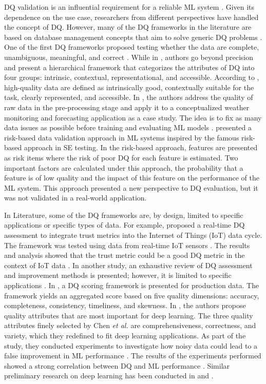 DQ validation is an influential requirement for a reliable ML system \cite{Foidl2019}. Given its dependence on the use case, researchers from different perspectives have handled the concept of DQ. However, many of the DQ frameworks in the literature are based on database management concepts that aim to solve generic DQ problems \cite{taleb2021}. One of the first DQ frameworks proposed testing whether the data are complete, unambiguous, meaningful, and correct \cite{Wand1996}. While in \cite{WangStrong1996}, authors go beyond precision and present a hierarchical framework that categorizes the attributes of DQ into four groups: intrinsic, contextual, representational, and accessible. According to \cite{WangStrong1996}, high-quality data are defined as intrinsically good, contextually suitable for the task, clearly represented, and accessible. In \cite{Juneja2019}, the authors address the quality of raw data in the pre-processing stage and apply it to a conceptualized weather monitoring and forecasting application as a case study. The idea is to fix as many data issues as possible before training and evaluating ML models \cite{Juneja2019}. \cite{Foidl2019} presented a risk-based data validation approach in ML systems inspired by the famous risk-based approach in SE testing. In the risk-based approach, features are presented as risk items where the risk of poor DQ for each feature is estimated. Two important factors are calculated under this approach, the probability that a feature is of low quality and the impact of this feature on the performance of the ML system. This approach presented a new perspective to DQ evaluation, but it was not validated in a real-world application. 

In Literature, some of the DQ frameworks are, by design, limited to specific applications or specific types of data. For example, \cite{Byabazaire2022} proposed a real-time DQ assessment to integrate trust metrics into the Internet of Things (IoT) data cycle. The framework was tested using data from real-time IoT sensors \cite{Byabazaire2022}. The results and analysis showed that the trust metric could be a good DQ metric in the context of IoT data \cite{Byabazaire2022}. In another study, an exhaustive review of DQ assessment and improvement methods is presented; however, it is limited to specific applications \cite{batini2009}. In \cite{Bayram2023}, a DQ scoring framework is presented for production data. The framework yields an aggregated score based on five quality dimensions: accuracy, completeness, consistency, timeliness, and skewness. In \cite{Chen2021}, the authors propose quality attributes that are most important for deep learning. The three quality attributes finely selected by Chen \emph{et al.} are comprehensiveness, correctness, and variety, which they redefined to fit deep learning applications. As part of the study, they conducted experiments to investigate how noisy data could lead to a false improvement in ML performance \cite{Chen2021}. The results of the experiments performed showed a strong correlation between DQ and ML performance \cite{Chen2021}. Similar preliminary research on deep learning has been conducted in \cite{Ding2019} and \cite{Chen2019}. 

